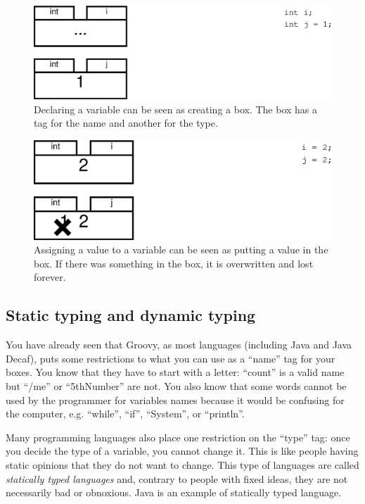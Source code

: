 \begin{figure}[hbtp]
  \centering
  \includegraphics[width=\textwidth]{gfx/variables1}
  \caption{Declaring a variable can be seen as creating a
    box. The box has a tag for the name and another for the type.}
  \label{fig:var1}
\end{figure}

\begin{figure}[hbtp]
  \centering
  \includegraphics[width=\textwidth]{gfx/variables2}
  \caption{Assigning a value to a variable can be seen as putting a
    value in the box. If there was something in the box, it is
    overwritten and lost forever.}
  \label{fig:var2}
\end{figure}

\subsection{Static typing and dynamic typing}
\label{sec:strong-typing-weak}

You have already seen that Groovy, as most languages (including Java
and Java Decaf), puts some
restrictions to what you can use as a ``name'' tag for your boxes. You
know that they have to start with a letter: ``count'' is a valid name
but ``/me'' or ``5thNumber'' are not. You also know that some words
cannot be used by the programmer for variables names because it would
be confusing for the computer, e.g. ``while'', ``if'', ``System'', or
``println''. 

Many programming languages also place one restriction on the ``type''
tag: once you decide the type of a variable, you cannot change
it. This is like people having static opinions that they do not want
to change. This type of languages are called \emph{statically typed
  languages} and, contrary to people with fixed ideas, they are
not necessarily bad or obnoxious. Java is an example of
statically typed language. 

